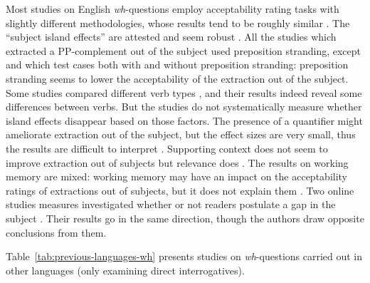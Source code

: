 {\tiny}

Most studies on English \textit{wh}-questions employ acceptability rating tasks with slightly different methodologies, whose results tend to be roughly similar \citep{Fukuda.2012}. The ``subject island effects'' are attested and seem robust \citep{Sprouse.2007.PhD,Jurka.2010,Sprouse.2012,Fukuda.2012,Sprouse.2016}. All the studies which extracted a PP-complement out of the subject used preposition stranding, except \citet[Experiment 8]{Jurka.2010} and \citet{Bianchi.2015} which test cases both with and without preposition stranding: preposition stranding seems to lower the acceptability of the extraction out of the subject. Some studies compared different verb types \citep{Jurka.2010,Polinsky.2013,Bianchi.2015}, and their results indeed reveal some differences between verbs. But the studies do not systematically measure whether island effects disappear based on those factors. The presence of a quantifier might ameliorate extraction out of the subject, but the effect sizes are very small, thus the results are difficult to interpret \citep[Experiment 11]{Jurka.2010}. Supporting context does not seem to improve extraction out of subjects \citep{Sprouse.2007.PhD} but relevance does \citet{Chaves.2020.UDC}. The results on working memory are mixed: working memory may have an impact on the acceptability ratings of extractions out of subjects, but it does not explain them \citep{Sprouse.2012}. Two online studies measures investigated  whether or not readers postulate a gap in the subject \citep{Phillips.2006,Chaves.2019.Frequency}. Their results go in the same direction, though the authors draw opposite conclusions from them.

Table~\ref{tab:previous-languages-wh} presents studies on \textit{wh}-questions carried out in other languages (only examining direct interrogatives).

{\tiny}


